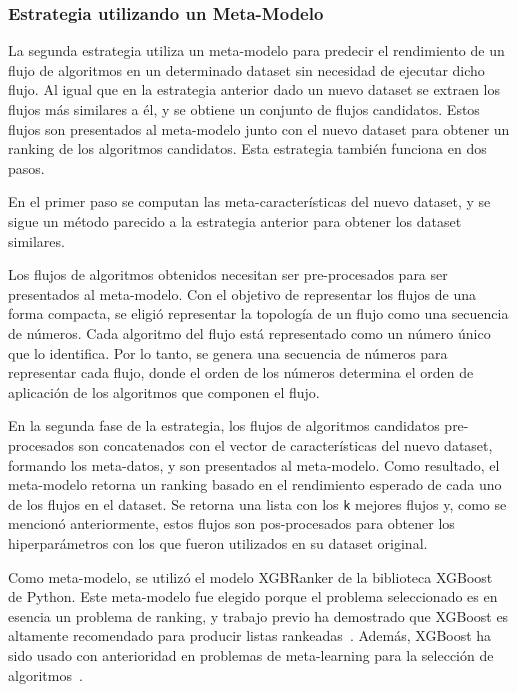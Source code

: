 \documentclass[a4paper,12pt]{article}
\begin{document}
	\subsubsection{Estrategia utilizando un Meta-Modelo}\label{subsub:ranker}

	La segunda estrategia utiliza un meta-modelo para predecir el rendimiento de un flujo de algoritmos en un determinado dataset sin necesidad de ejecutar dicho flujo. Al igual que en la estrategia anterior dado un nuevo dataset se extraen los flujos más similares a él, y se obtiene un conjunto de flujos candidatos. Estos flujos son presentados al meta-modelo junto con el nuevo dataset para obtener un ranking de los algoritmos candidatos. Esta estrategia también funciona en dos pasos.

	En el primer paso se computan las meta-características del nuevo dataset, y se sigue un método parecido a la estrategia anterior para obtener los dataset similares.

	Los flujos de algoritmos obtenidos necesitan ser pre-procesados para ser presentados al meta-modelo. Con el objetivo de representar los flujos de una forma compacta, se eligió representar la topología de un flujo como una secuencia de números. Cada algoritmo del flujo está representado como un número único que lo identifica. Por lo tanto, se genera una secuencia de números para representar cada flujo, donde el orden de los números determina el orden de aplicación de los algoritmos que componen el flujo.

	En la segunda fase de la estrategia, los flujos de algoritmos candidatos pre-procesados son concatenados con el vector de características del nuevo dataset, formando los meta-datos, y son presentados al meta-modelo. Como resultado, el meta-modelo retorna un ranking basado en el rendimiento esperado de cada uno de los flujos en el dataset. Se retorna una lista con los \texttt{k} mejores flujos y, como se mencionó anteriormente, estos flujos son pos-procesados para obtener los hiperparámetros con los que fueron utilizados en su dataset original.

	Como meta-modelo, se utilizó el modelo XGBRanker de la biblioteca XGBoost~\cite{xgboost} de Python. Este meta-modelo fue elegido porque el problema seleccionado es en esencia un problema de ranking, y trabajo previo ha demostrado que XGBoost es altamente recomendado para producir listas rankeadas~\cite{rankml}. Además, XGBoost ha sido usado con anterioridad en problemas de meta-learning para la selección de algoritmos~\cite{rankml, atomic}.
\end{document}
